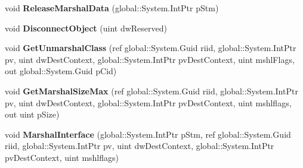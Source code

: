 \begin{DoxyCompactItemize}
\item 
\mbox{\label{interface_system_1_1_runtime_1_1_interop_services_1_1_i_marshal_____system___runtime___windows_runtime_a3b9d876c6a7a35f23897b4e47568578c}} 
void {\bfseries Release\+Marshal\+Data} (global\+::\+System.\+Int\+Ptr p\+Stm)
\item 
\mbox{\label{interface_system_1_1_runtime_1_1_interop_services_1_1_i_marshal_____system___runtime___windows_runtime_a6c9ed45c61839a823eaeb6e035dd2e25}} 
void {\bfseries Disconnect\+Object} (uint dw\+Reserved)
\item 
\mbox{\label{interface_system_1_1_runtime_1_1_interop_services_1_1_i_marshal_____system___runtime___windows_runtime_ac0f4d724dea939dbf088fe46a53dec1a}} 
void {\bfseries Get\+Unmarshal\+Class} (ref global\+::\+System.\+Guid riid, global\+::\+System.\+Int\+Ptr pv, uint dw\+Dest\+Context, global\+::\+System.\+Int\+Ptr pv\+Dest\+Context, uint mshl\+Flags, out global\+::\+System.\+Guid p\+Cid)
\item 
\mbox{\label{interface_system_1_1_runtime_1_1_interop_services_1_1_i_marshal_____system___runtime___windows_runtime_a79af4aa5ca6d5a68217437912f3c9333}} 
void {\bfseries Get\+Marshal\+Size\+Max} (ref global\+::\+System.\+Guid riid, global\+::\+System.\+Int\+Ptr pv, uint dw\+Dest\+Context, global\+::\+System.\+Int\+Ptr pv\+Dest\+Context, uint mshlflags, out uint p\+Size)
\item 
\mbox{\label{interface_system_1_1_runtime_1_1_interop_services_1_1_i_marshal_____system___runtime___windows_runtime_a8598188070b1e46f9ba750c61433e126}} 
void {\bfseries Marshal\+Interface} (global\+::\+System.\+Int\+Ptr p\+Stm, ref global\+::\+System.\+Guid riid, global\+::\+System.\+Int\+Ptr pv, uint dw\+Dest\+Context, global\+::\+System.\+Int\+Ptr pv\+Dest\+Context, uint mshlflags)
\item 

\end{DoxyCompactItemize}
